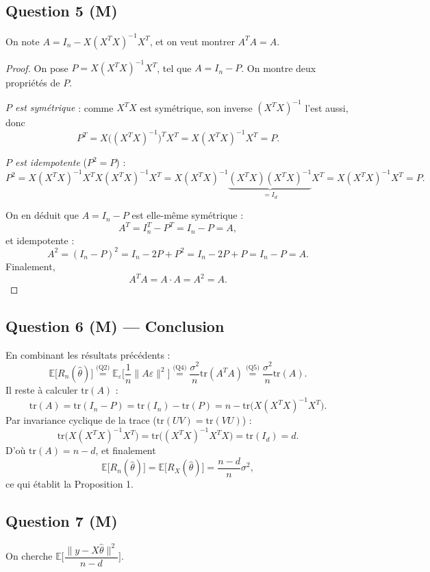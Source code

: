\documentclass[11pt]{article}
\theoremstyle{remark}
\newcommand{\E}{\mathbb{E}}
\newcommand{\tr}{\mathrm{tr}}
\begin{document}
	\subsection*{Question 5 (M)}
	
	On note $A = I_n - X(X^TX)^{-1}X^T$, et on veut montrer $A^TA = A$.
	
	\begin{proof}
		On pose $P = X(X^TX)^{-1}X^T$, tel que $A = I_n - P$. On montre deux propriétés de $P$.
		
		\emph{$P$ est symétrique} : comme $X^TX$ est symétrique, son inverse $(X^TX)^{-1}$ l'est aussi, donc
		\[
		P^T = X\big((X^TX)^{-1}\big)^TX^T = X(X^TX)^{-1}X^T = P.
		\]
		
		\emph{$P$ est idempotente} ($P^2=P$) :
		\[
		P^2 = X(X^TX)^{-1}X^TX(X^TX)^{-1}X^T = X(X^TX)^{-1}\underbrace{(X^TX)(X^TX)^{-1}}_{=I_d}X^T = X(X^TX)^{-1}X^T = P.
		\]
		
		On en déduit que $A=I_n-P$ est elle-même symétrique :
		\[
		A^T = I_n^T - P^T = I_n - P = A,
		\]
		et idempotente :
		\[
		A^2 = (I_n-P)^2 = I_n - 2P + P^2 = I_n - 2P + P = I_n - P = A.
		\]
		Finalement,
		\[
		A^TA = A \cdot A = A^2 = A.
		\]
	\end{proof}
	
	\subsection*{Question 6 (M) --- Conclusion}
	
	En combinant les résultats précédents :
	\[
	\E\big[R_n(\hat\theta)\big] \overset{\text{(Q2)}}{=} \E_\varepsilon\Big[\frac1n\|A\varepsilon\|^2\Big] \overset{\text{(Q4)}}{=} \frac{\sigma^2}{n}\tr(A^TA) \overset{\text{(Q5)}}{=} \frac{\sigma^2}{n}\tr(A).
	\]
	Il reste à calculer $\tr(A)$ :
	\[
	\tr(A) = \tr(I_n - P) = \tr(I_n) - \tr(P) = n - \tr\big(X(X^TX)^{-1}X^T\big).
	\]
	Par invariance cyclique de la trace ($\tr(UV)=\tr(VU)$) :
	\[
	\tr\big(X(X^TX)^{-1}X^T\big) = \tr\big((X^TX)^{-1}X^TX\big) = \tr(I_d) = d.
	\]
	D'où $\tr(A) = n-d$, et finalement
	\[
	\boxed{\E\big[R_n(\hat\theta)\big] = \E\big[R_X(\hat\theta)\big] = \frac{n-d}{n}\sigma^2},
	\]
	ce qui établit la Proposition 1.
	
	\subsection*{Question 7 (M)}
	
	On cherche $\E\Big[\dfrac{\|y-X\hat\theta\|^2}{n-d}\Big]$.
	
\end{document}
